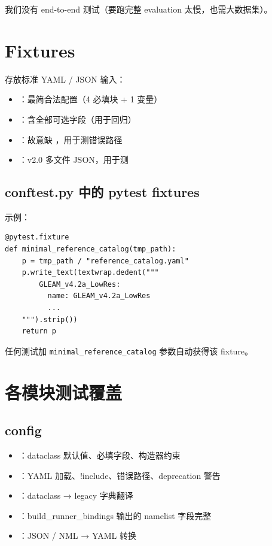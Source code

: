 我们没有 end-to-end 测试（要跑完整 evaluation 太慢，也需大数据集）。

\section{Fixtures}

 存放标准 YAML / JSON 输入：

\begin{itemize}
  \item {}：最简合法配置（4 必填块 + 1 变量）
  \item {}：含全部可选字段（用于回归）
  \item {}：故意缺 ，用于测错误路径
  \item {}：v2.0 多文件 JSON，用于测 
\end{itemize}

\subsection{conftest.py 中的 pytest fixtures}

 示例：

\begin{verbatim}
@pytest.fixture
def minimal_reference_catalog(tmp_path):
    p = tmp_path / "reference_catalog.yaml"
    p.write_text(textwrap.dedent("""
        GLEAM_v4.2a_LowRes:
          name: GLEAM_v4.2a_LowRes
          ...
    """).strip())
    return p
\end{verbatim}

任何测试加 \texttt{minimal\_reference\_catalog} 参数自动获得该 fixture。

\section{各模块测试覆盖}

\subsection{config}

\begin{itemize}
  \item {}：dataclass 默认值、必填字段、构造器约束
  \item {}：YAML 加载、!include、错误路径、deprecation 警告
  \item {}：dataclass → legacy 字典翻译
  \item {}：build\_runner\_bindings 输出的 namelist 字段完整
  \item {}：JSON / NML → YAML 转换
\end{itemize}

